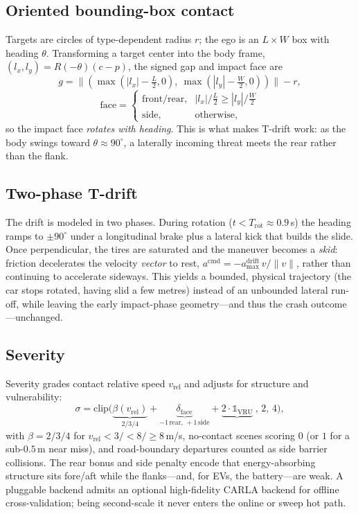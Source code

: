 \documentclass[conference]{IEEEtran}
\begin{document}
\subsection{Oriented bounding-box contact}
Targets are circles of type-dependent radius $r$; the ego is an
$L{\times}W$ box with heading $\theta$. Transforming a target center into the
body frame, $(l_x,l_y)=R(-\theta)(c-p)$, the signed gap and impact face are
\begin{equation}
g=\big\lVert(\max(|l_x|-\tfrac{L}{2},0),\ \max(|l_y|-\tfrac{W}{2},0))\big\rVert-r,
\end{equation}
\begin{equation}
\mathrm{face}=\begin{cases}\text{front/rear},&|l_x|/\tfrac{L}{2}\ge|l_y|/\tfrac{W}{2}\\\text{side},&\text{otherwise,}\end{cases}
\end{equation}
so the impact face \emph{rotates with heading}. This is what makes T-drift
work: as the body swings toward $\theta\!\approx\!90^\circ$, a laterally
incoming threat meets the rear rather than the flank.

\subsection{Two-phase T-drift}
The drift is modeled in two phases. During rotation ($t<T_{\mathrm{rot}}\!\approx\!0.9$\,s)
the heading ramps to $\pm90^\circ$ under a longitudinal brake plus a lateral
kick that builds the slide. Once perpendicular, the tires are saturated and
the maneuver becomes a \emph{skid}: friction decelerates the velocity
\emph{vector} to rest,
$a^{\mathrm{cmd}}=-a_{\max}^{\mathrm{drift}}\,v/\lVert v\rVert$,
rather than continuing to accelerate sideways. This yields a bounded, physical
trajectory (the car stops rotated, having slid a few metres) instead of an
unbounded lateral run-off, while leaving the early impact-phase geometry---and
thus the crash outcome---unchanged.

\subsection{Severity}
Severity grades contact relative speed $v_{\mathrm{rel}}$ and adjusts for
structure and vulnerability:
\begin{equation}
\sigma=\mathrm{clip}\Big(\underbrace{\beta(v_{\mathrm{rel}})}_{2/3/4}+\underbrace{\delta_{\mathrm{face}}}_{-1\,\mathrm{rear},\,+1\,\mathrm{side}}+\underbrace{2\cdot\mathbb{1}_{\mathrm{VRU}}}_{}\ ,\,2,\,4\Big),
\end{equation}
with $\beta{=}2/3/4$ for $v_{\mathrm{rel}}<3/<8/\ge8$\,m/s, no-contact scenes
scoring $0$ (or $1$ for a sub-$0.5$\,m near miss), and road-boundary
departures counted as side barrier collisions. The rear bonus and side penalty
encode that energy-absorbing structure sits fore/aft while the flanks---and,
for EVs, the battery---are weak. A pluggable backend admits an optional
high-fidelity CARLA backend for offline cross-validation; being second-scale
it never enters the online or sweep hot path.
\end{document}
